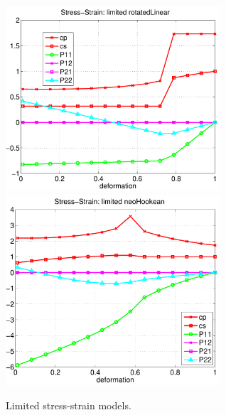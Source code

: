{\newcommand{\graphWidth}{8cm}
\begin{figure}
\begin{center}
  \includegraphics[width=\graphWidth]{fig/rotatedLinearlimitedStressStrain}
  \includegraphics[width=\graphWidth]{fig/neoHookeanlimitedStressStrain}
  \caption{Limited stress-strain models.}
  \label{fig:largeStressStrainLimited}
\end{center}
\end{figure}
}


